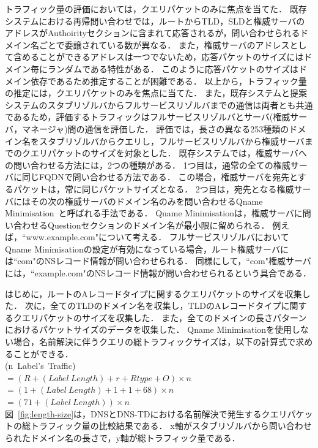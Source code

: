 トラフィック量の評価においては，クエリパケットのみに焦点を当てた．
既存システムにおける再帰問い合わせでは，ルートからTLD，SLDと権威サーバのアドレスがAuthoirityセクションに含まれて応答されるが，問い合わせられるドメイン名ごとで委譲されている数が異なる．
また，権威サーバのアドレスとして含めることができるアドレスは一つでないため，応答パケットのサイズにはドメイン毎にランダムである特性がある．
このように応答パケットのサイズはドメイン依存であるため推定することが困難である．
以上から，トラフィック量の推定には，クエリパケットのみを焦点に当てた．
また，既存システムと提案システムのスタブリゾルバからフルサービスリゾルバまでの通信は両者とも共通であるため，評価するトラフィックはフルサービスリゾルバとサーバ(権威サーバ，マネージャ)間の通信を評価した．
評価では，長さの異なる253種類のドメイン名をスタブリゾルバからクエリし，フルサービスリゾルバから権威サーバまでのクエリパケットのサイズを対象とした．
既存システムでは，権威サーバへの問い合わせる方法には，2つの種類がある．
1つ目は，通常の全ての権威サーバに同じFQDNで問い合わせる方法である．
この場合，権威サーバを宛先とするパケットは，常に同じパケットサイズとなる．
2つ目は，宛先となる権威サーバにはその次の権威サーバのドメイン名のみを問い合わせるQname Minimisation~\cite{rfc7816}と呼ばれる手法である．
Qname Minimisationは，権威サーバに問い合わせるQuestionセクションのドメイン名が最小限に留められる．
例えば，``www.example.com"について考える．
フルサービスリゾルバにおいてQname Minimisationの設定が有効になっている場合，ルート権威サーバには``com"のNSレコード情報が問い合わせられる．
同様にして，``com"権威サーバには，``example.com"のNSレコード情報が問い合わせられるという具合である．

はじめに，ルートのAレコードタイプに関するクエリパケットのサイズを収集した．
次に，全てのTLDのドメイン名を収集し，TLDのAレコードタイプに関するクエリパケットのサイズを収集した．
また，全てのドメインの長さパターンにおけるパケットサイズのデータを収集した．
Qname Minimisationを使用しない場合，名前解決に伴うクエリの総トラフィックサイズは，以下の計算式で求めることができる．\\

(n\ Label's\ Traffic) \\
 $= (R + (Label\ Length) + r + Rtype + O) \times n$\\
 $= (1 + (Label\ Length) + 1 + 1 + 68) \times n$\\
 $= (71 + (Label\ Length)) \times n$\\


図~\ref{fig:length-size}は，DNSとDNS-TDにおける名前解決で発生するクエリパケットの総トラフィック量の比較結果である．
x軸がスタブリゾルバから問い合わせられたドメイン名の長さで，y軸が総トラフィック量である．

